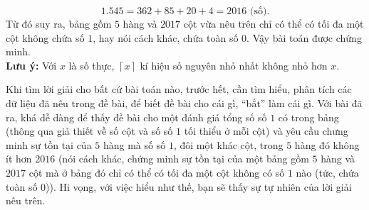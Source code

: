 \begin{bt}
{		$$1{.}545=362+85+20+4=2016 \,\, \text{(số).}$$
		Từ đó suy ra, bảng gồm $5$ hàng và $2017$ cột vừa nêu trên chỉ có thể có tối đa một cột không chứa số $1$, hay nói cách khác, chứa toàn số $0$.
		Vậy bài toán được chứng minh.\\
		\textbf{Lưu ý:} Với $x$ là số thực, $\left\lceil x\right\rceil$ kí hiệu số nguyên nhỏ nhất không nhỏ hơn $x$.
		\begin{nx}
			Khi tìm lời giải cho bất cứ bài toán nào, trước hết, cần tìm hiểu, phân tích các dữ liệu đã nêu trong đề bài, để biết đề bài cho cái gì, ``bắt'' làm cái gì. Với bài đã ra, khá dễ dàng để thấy đề bài cho một đánh giá tổng số số $1$ có trong bảng (thông qua giả thiết về số cột và số số $1$ tối thiểu ở mỗi cột) và yêu cầu chưng minh sự tồn tại của $5$ hàng mà số số $1$, đôi một khác cột, trong $5$ hàng đó không ít hơn $2016$ (nói cách khác, chứng minh sự tồn tại của một bảng gồm $5$ hàng và $2017$ cột mà ở bảng đó chỉ có thể có tối đa một cột không có số $1$ nào (tức, chứa toàn số $0$)). Hi vọng, với việc hiểu như thế, bạn sẽ thấy sự tự nhiên của lời giải nêu trên.
		\end{nx}
	}
\end{bt}
